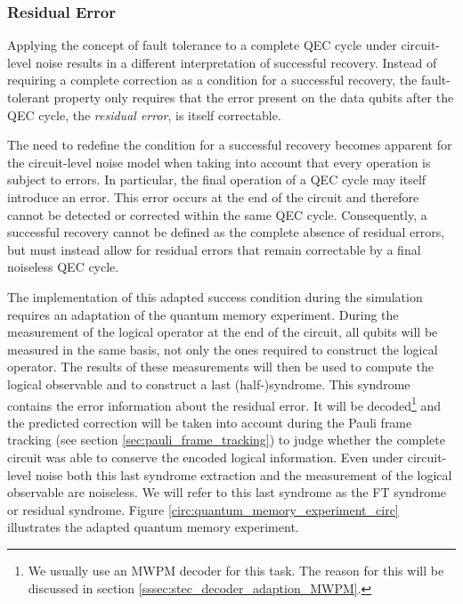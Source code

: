 \subsubsection*{Residual Error}\label{sssec:residual_error}

Applying the concept of fault tolerance to a complete QEC cycle under circuit-level noise results in a different interpretation of successful recovery.
Instead of requiring a complete correction as a condition for a successful recovery, 
the fault-tolerant property only requires that the error present on the data qubits after the QEC cycle, the \emph{residual error}, is itself correctable.

The need to redefine the condition for a successful recovery becomes apparent for the circuit-level noise model 
when taking into account that every operation is subject to errors. 
In particular, the final operation of a QEC cycle may itself introduce an error. 
This error occurs at the end of the circuit and therefore cannot be detected or corrected within the same QEC cycle. 
Consequently, a successful recovery cannot be defined as the complete absence of residual errors, 
but must instead allow for residual errors that remain correctable by a final noiseless QEC cycle.

The implementation of this adapted success condition during the simulation requires an adaptation of the quantum memory experiment.
During the measurement of the logical operator at the end of the circuit, 
all qubits will be measured in the same basis, not only the ones required to construct the logical operator. 
The results of these measurements will then be used to compute the logical observable and to construct a last (half-)syndrome.
This syndrome contains the error information about the residual error.
It will be decoded\footnote{
    We usually use an MWPM decoder for this task.
    The reason for this will be discussed in section \ref{sssec:stec_decoder_adaption_MWPM}.
} and the predicted correction will be taken into account during the Pauli frame tracking (see section \ref{sec:pauli_frame_tracking}) 
to judge whether the complete circuit was able to conserve the encoded logical information.
Even under circuit-level noise both this last syndrome extraction and the measurement of the logical observable are noiseless.
We will refer to this last syndrome as the FT syndrome or residual syndrome.
Figure \ref{circ:quantum_memory_experiment_circ} illustrates the adapted quantum memory experiment.

